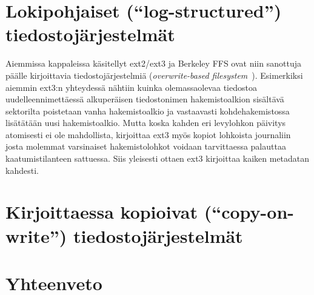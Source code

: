 \section{Lokipohjaiset (``log-structured'') tiedostojärjestelmät}
Aiemmissa kappaleissa käsitellyt ext2/ext3 ja Berkeley FFS ovat niin sanottuja päälle kirjoittavia tiedostojärjestelmiä (\emph{overwrite-based filesystem}~\cite{Btrfs}).
Esimerkiksi aiemmin ext3:n yhteydessä nähtiin kuinka olemassaolevaa tiedostoa uudelleennimettäessä
alkuperäisen tiedostonimen hakemistoalkion sisältävä sektorilta poistetaan vanha hakemistoalkio
ja vastaavasti kohdehakemistossa lisätätään uusi hakemistoalkio.
Mutta koska kahden eri levylohkon päivitys atomisesti ei ole mahdollista,
kirjoittaa ext3 myös kopiot lohkoista journaliin josta molemmat varsinaiset hakemistolohkot voidaan tarvittaessa palauttaa kaatumistilanteen sattuessa.
Siis yleisesti ottaen ext3 kirjoittaa kaiken metadatan kahdesti.

\section{Kirjoittaessa kopioivat (``copy-on-write'') tiedostojärjestelmät}

\section{Yhteenveto}
